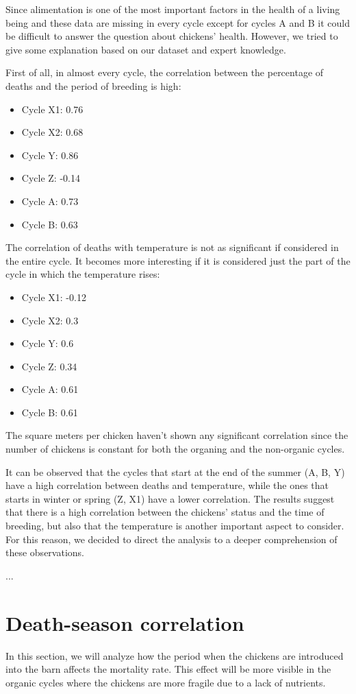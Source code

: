 \documentclass[11pt]{article}
\begin{document}
Since alimentation is one of the most important factors in the health of a living being and these data are missing in every cycle except for cycles A and B it could be difficult to answer the question
about chickens' health.
However, we tried to give some explanation based on our dataset and expert knowledge.

First of all, in almost every cycle, the correlation between the percentage of deaths and the period of breeding is high:
\begin{itemize}
    \item Cycle X1: 0.76
    \item Cycle X2: 0.68
    \item Cycle Y: 0.86 
    \item Cycle Z: -0.14
    \item Cycle A: 0.73
    \item Cycle B: 0.63
\end{itemize}

The correlation of deaths with temperature is not as significant if considered in the entire cycle. It becomes more interesting if it is considered just the part of the cycle in which the temperature rises:
\begin{itemize}
    \item Cycle X1: -0.12
    \item Cycle X2: 0.3
    \item Cycle Y: 0.6
    \item Cycle Z: 0.34
    \item Cycle A: 0.61
    \item Cycle B: 0.61
\end{itemize}

The square meters per chicken haven't shown any significant correlation since the number of chickens is constant for both the organing and the non-organic cycles.

It can be observed that the cycles that start at the end of the summer (A, B, Y) have a high correlation between deaths and temperature, while the ones that
starts in winter or spring (Z, X1) have a lower correlation.
The results suggest that there is a high correlation between the chickens' status and the time of breeding, but also that the temperature is another important aspect
to consider. For this reason, we decided to direct the analysis to a deeper comprehension of these observations.

...

\section{Death-season correlation}
In this section, we will analyze how the period when the chickens are introduced into the barn affects the mortality rate. This effect will be more visible in the organic cycles where the chickens are more fragile due to a lack of nutrients.
\end{document}
